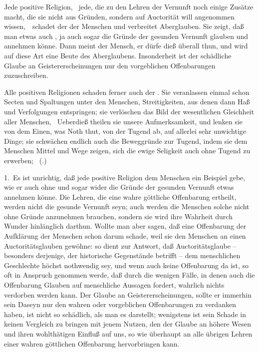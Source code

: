 \begin{aufza}
\item Jede positive Religion, \dh\ jede, die zu den Lehren der Vernunft noch einige Zusätze macht, die sie nicht aus Gründen, sondern auf Auctorität will angenommen wissen,~\ schadet der  der Menschen und verbreitet Aberglauben. Sie zeigt, daß man etwas auch , ja auch sogar  die Gründe der gesunden Vernunft glauben und annehmen könne. Dann meint der Mensch, er dürfe dieß überall thun, und wird auf diese Art eine Beute des Aberglaubens. Insonderheit ist der schädliche Glaube an Geistererscheinungen nur den vorgeblichen Offenbarungen zuzuschreiben.
\item Alle positiven Religionen schaden ferner auch der . Sie veranlassen einmal schon Secten und Spaltungen unter den Menschen, Streitigkeiten, aus denen dann Haß und Verfolgungen entspringen; sie verlöschen das Bild der wesentlichen Gleichheit aller Menschen, \usw\ Ueberdieß theilen sie unsere Aufmerksamkeit, und lenken sie von dem Einen, was Noth thut, von der Tugend ab, auf allerlei sehr unwichtige Dinge; sie schwächen endlich auch die Beweggründe zur Tugend, indem sie dem Menschen Mittel und Wege zeigen, sich die ewige Seligkeit auch ohne Tugend zu erwerben; \udgl\  (.)
\end{aufza}\par
{} 1.~Es ist unrichtig, daß jede positive Religion dem Menschen ein Beispiel gebe, wie er auch ohne und sogar wider die Gründe der gesunden Vernunft etwas annehmen könne. Die Lehren, die eine wahre göttliche Offenbarung ertheilt, werden nicht  die gesunde Vernunft seyn; auch werden die Menschen solche nicht ohne Gründe anzunehmen brauchen, sondern sie wird ihre Wahrheit durch Wunder hinlänglich darthun. Wollte man aber sagen, daß eine Offenbarung der Aufklärung der Menschen schon darum schade, weil sie den Menschen an einen Auctoritätsglauben gewöhne: so dient zur Antwort, daß Auctoritätsglaube -- besonders derjenige, der historische Gegenstände betrifft -- dem menschlichen Geschlechte höchst nothwendig sey, und wenn auch keine Offenbarung da ist, so oft in Anspruch genommen werde, daß durch die wenigen Fälle, in denen auch die Offenbarung Glauben auf menschliche Aussagen fordert, wahrlich nichts verdorben werden kann. Der Glaube an Geistererscheinungen, sollte er immerhin sein Daseyn nur den wahren oder vorgeblichen Offenbarungen zu verdanken haben, ist nicht so schädlich, als man es darstellt; wenigstens ist sein Schade in keinen Vergleich zu bringen mit jenem Nutzen, den der Glaube an höhere Wesen und ihren wohlthätigen Einfluß auf uns, so wie überhaupt an alle übrigen Lehren einer wahren göttlichen Offenbarung hervorbringen kann.
